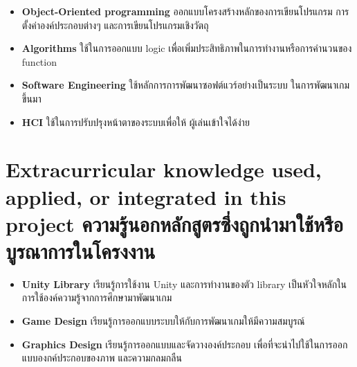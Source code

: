 \begin{itemize}
  \item \textbf{Object-Oriented programming} ออกแบบโครงสร้างหลักของการเขียนโปรแกรม การตั้งค่าองค์ประกอบต่างๆ และการเขียนโปรแกรมเชิงวัตถุ
  \item \textbf{Algorithms} ใช้ในการออกแบบ logic เพื่อเพิ่มประสิทธิภาพในการทำงานหรือการคำนวนของ function
  \item \textbf{Software Engineering} ใช้หลักการการพัฒนาซอฟต์แวร์อย่างเป็นระบบ ในการพัฒนาเกมขึ้นมา
  \item \textbf{HCI} ใช้ในการปรับปรุงหน้าตาของระบบเพื่อให้ ผู้เล่นเข้าใจได้ง่าย
\end{itemize}

\section{\ifenglish%
    Extracurricular knowledge used, applied, or integrated in this project
  \else%
    ความรู้นอกหลักสูตรซึ่งถูกนำมาใช้หรือบูรณาการในโครงงาน
  \fi
 }

\begin{itemize}
  \item \textbf{Unity Library} เรียนรู้การใช้งาน Unity และการทำงานของตัว library เป็นหัวใจหลักในการใช้องค์ความรู้จากการศึกษามาพัฒนาเกม
  \item \textbf{Game Design} เรียนรู้การออกแบบระบบให้กับการพัฒนาเกมให้มีความสมบูรณ์
  \item \textbf{Graphics Design} เรียนรู้การออกแบบและจัดวางองค์ประกอบ เพื่อที่จะนำไปใช้ในการออกแบบองกค์ประกอบของภาพ และความกลมกลืน
\end{itemize}

